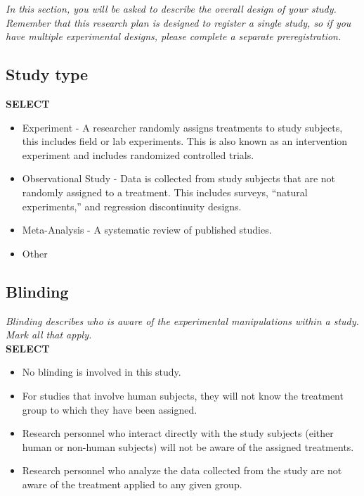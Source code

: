 \documentclass{article}
\begin{document}
	\ifx\hidehints\undefined
	\textit{In this section, you will be asked to describe the overall design of your study. Remember that this research plan is designed to register a single study, so if you have multiple experimental designs, please complete a separate preregistration.}
	\fi
	
	\subsection*{Study type}
	
	\ifx\hidehints\undefined
		\textbf{SELECT}
	\fi
	
	\begin{itemize}
		\item Experiment - A researcher randomly assigns treatments to study subjects, this includes field or lab experiments. This is also known as an intervention experiment and includes randomized controlled trials.
		\item Observational Study - Data is collected from study subjects that are not randomly assigned to a treatment. This includes surveys, ``natural experiments,'' and regression discontinuity designs. 
		\item Meta-Analysis - A systematic review of published studies.
		\item Other
	\end{itemize}
	
	\subsection*{Blinding}
	
	\ifx\hidehints\undefined
	
	\textit{%
		Blinding describes who is aware of the experimental manipulations within a study. Mark all that apply.
	}\\
	
	\textbf{SELECT}
	
	\fi
	
	\begin{itemize}
		\renewcommand{\labelitemi}{\scriptsize$\square$}
		\item No blinding is involved in this study.
		\item For studies that involve human subjects, they will not know the treatment group to which they have been assigned.
		\item Research personnel who interact directly with the study subjects (either human or non-human subjects) will not be aware of the assigned treatments. 
		\item Research personnel who analyze the data collected from the study are not aware of the treatment applied to any given group. 
	\end{itemize}
	
\end{document}
